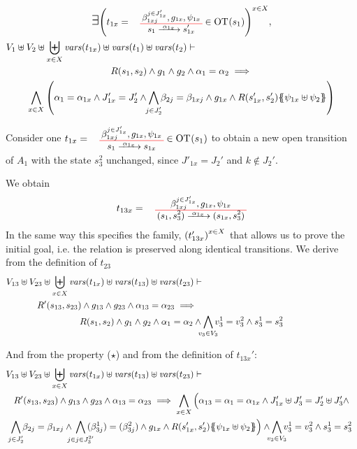 \documentclass[runningheads]{llncs}
\begin{document}
\begin{enumerate}
\begin{multline*}
\bigexists 
\mpar{t_{1x} = \OTx{1}{x}{1x}{1x} \in \fOT{s_1}}^{x \in X},\\
  V_1 \uplus V_2 \uplus \biguplus_{x\in X}\fvars{t_{1x}} \uplus \fvars{t_1} \uplus \fvars{t_2} \vdash \hspace{6cm}\\  R\mpar{s_1, s_2} \wedge 	g_1 \wedge g_2 \wedge \alpha_1 = \alpha_2 
\implies \\
\bigwedge_{x\in X}
\mpar{
\alpha_1=\alpha_{1 x}  \land J'_{1x}= J'_2 \land \bigwedge_\subbox{j \in J'_2 } \beta_{2j} = \beta_{1xj}\land g_{1 x}\land
 R\mpar{s'_{1 x}, s'_2}\psubst{\psi_{1 x} \uplus \psi_2}}
\end{multline*}

Consider one $t_{1x}=\OT{s_1}{s_{1x}}{\alpha_{1x}}{\beta_{1xj}^{j \in J'_{1x}}}{g_{1x}}{\psi_{1x}}\in \fOT{s_1}$ to obtain a new open transition of $A_1$    with the state $s^2_3$ unchanged, since $J'_{1x} = J_2'$ and $k \not\in J_2'$.


We obtain 
\[t_{13x}=\OT{(s_1,s^2_3)}{(s_{1x},s^2_3)}{\alpha_{1x}}{\beta_{1xj}^{j \in J'_{1x}}}{g_{1x}}{\psi_{1x}}\]
In the same way this specifies the family, ${\left(t_{13x}'\right)}^{x\in X}$
that allows us to prove the initial goal, i.e. the relation is preserved along identical transitions. We derive  from the definition of  $t_{23}$
\begin{multline*}
  V_{13} \uplus V_{23} \uplus  \biguplus_{x\in X}\fvars{t_{1x}}  \uplus \fvars{t_{13}} \uplus \fvars{t_{23}} 
\vdash \hspace{6cm}\\  R'\mpar{s_{13}, s_{23}} \wedge 	g_{13} \wedge g_{23} \wedge \alpha_{13} = \alpha_{23} 
\implies \hspace{5cm}\\
 R\mpar{s_{1}, s_{2}} \wedge 	g_{1} \wedge g_2  \wedge \alpha_{1} = \alpha_{2} \wedge \bigwedge_\subbox{v_3\in V_3}
 v^1_3=v^2_3\wedge s^1_3 = s^2_3
\end{multline*}

And from the property ($\star$) and from the definition of $t_{13x}'$:
\begin{multline*}
  V_{13} \uplus V_{23} \uplus  \biguplus_{x\in X}\fvars{t_{1x}}  \uplus \fvars{t_{13}} \uplus \fvars{t_{23}} 
\vdash \hspace{6cm}\\  R'\mpar{s_{13}, s_{23}} \wedge 	g_{13} \wedge g_{23} \wedge \alpha_{13} = \alpha_{23} 
\implies 
\bigwedge_{x\in X}
\Big(
 \alpha_{13}=\alpha_1=\alpha_{1 x}  \land J'_{1x}\uplus J'_3= J'_2\uplus J'_3\land \\
  \bigwedge_\subbox{j \in J'_2  } \beta_{2j} = \beta_{1xj}
 \land \bigwedge_\subbox{j \in {j \in J^{2 \prime}_3} }  (\beta^1_{3j}) = (\beta^2_{3j}) \land g_{1 x}\land
 R\mpar{s'_{1x}, s'_{2}}\psubst{\psi_{1 x} \uplus \psi_2}\Big) 
 \wedge \bigwedge_\subbox{v_3\in V_3}
 v^1_3=v^2_3\wedge s^1_3 = s^2_3
 \end{multline*}


\end{enumerate}
\end{document}
